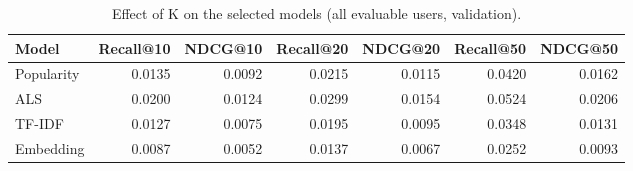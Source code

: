\begin{table}[t]
\centering
\caption{Effect of K on the selected models (all evaluable users, validation).}
\label{tab:effect-k}
\begin{tabular}{lrrrrrr}
\hline
Model & Recall@10 & NDCG@10 & Recall@20 & NDCG@20 & Recall@50 & NDCG@50 \\
\hline
Popularity & 0.0135 & 0.0092 & 0.0215 & 0.0115 & 0.0420 & 0.0162 \\
ALS & 0.0200 & 0.0124 & 0.0299 & 0.0154 & 0.0524 & 0.0206 \\
TF-IDF & 0.0127 & 0.0075 & 0.0195 & 0.0095 & 0.0348 & 0.0131 \\
Embedding & 0.0087 & 0.0052 & 0.0137 & 0.0067 & 0.0252 & 0.0093 \\
\hline
\end{tabular}
\end{table}
